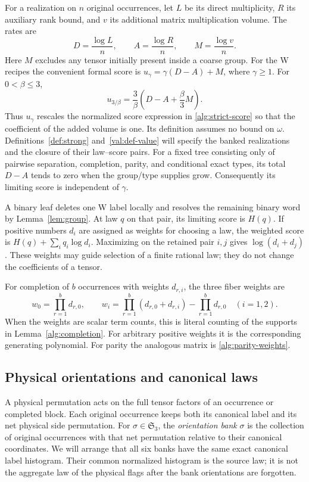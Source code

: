 For a realization on \(n\) original occurrences, let \(L\) be its direct
multiplicity, \(R\) its auxiliary rank bound, and \(v\) its additional
matrix multiplication volume.  The rates are
\[
 D=\frac{\log L}{n},\qquad A=\frac{\log R}{n},\qquad
 M=\frac{\log v}{n}.
\]
Here \(M\) excludes any tensor initially present inside a coarse group.
For the W recipes the convenient formal score is
\(u_\gamma=\gamma(D-A)+M\), where \(\gamma\geq1\).
For \(0<\beta\leq3\),
\[
 u_{3/\beta}=\frac3\beta\left(D-A+\frac\beta3M\right).
\]
Thus \(u_\gamma\) rescales the normalized score expression in
\eqref{alg:strict-score} so that the coefficient of the added volume is one.
Its definition assumes no bound on \(\omega\).
Definitions~\ref{def:strong} and~\ref{val:def-value} will specify the
banked realizations and the closure of their law--score pairs.
For a fixed tree consisting only of
pairwise separation, completion, parity, and conditional exact types,
its total \(D-A\) tends to zero when the group/type supplies grow.
Consequently its limiting score is independent of \(\gamma\).

A binary leaf deletes one W label locally and resolves the remaining
binary word by Lemma~\ref{lem:group}.  At law \(q\) on that pair, its
limiting score is \(H(q)\).  If positive numbers \(d_i\) are assigned as
weights for choosing a law, the weighted score is
\(H(q)+\sum_iq_i\log d_i\).  Maximizing on the retained pair \(i,j\)
gives \(\log(d_i+d_j)\).  These weights may guide selection of a finite
rational law; they do not change the coefficients of a tensor.

For completion of \(b\) occurrences with weights \(d_{r,i}\), the three
fiber weights are
\begin{equation}
 w_0=\prod_{r=1}^b d_{r,0},\qquad
 w_i=\prod_{r=1}^b(d_{r,0}+d_{r,i})-\prod_{r=1}^b d_{r,0}
 \quad(i=1,2).
 \label{alg:complete-weights}
\end{equation}
When the weights are scalar term counts, this is literal counting of the
supports in Lemma~\ref{alg:completion}.  For arbitrary positive weights
it is the corresponding generating polynomial.  For parity the analogous
matrix is \eqref{alg:parity-weights}.

\subsection{Physical orientations and canonical laws}

A physical permutation acts on the full tensor factors of an occurrence or
completed block.  Each original occurrence keeps both its canonical label
and its net physical side permutation.  For
\(\sigma\in\mathfrak S_3\), the \emph{orientation bank} \(\sigma\)
is the collection of original occurrences with that net permutation
relative to their canonical coordinates.  We will arrange that all six
banks have the same exact canonical label histogram.  Their common
normalized histogram is the source law; it is not the aggregate law of the
physical flags after the bank orientations are forgotten.

